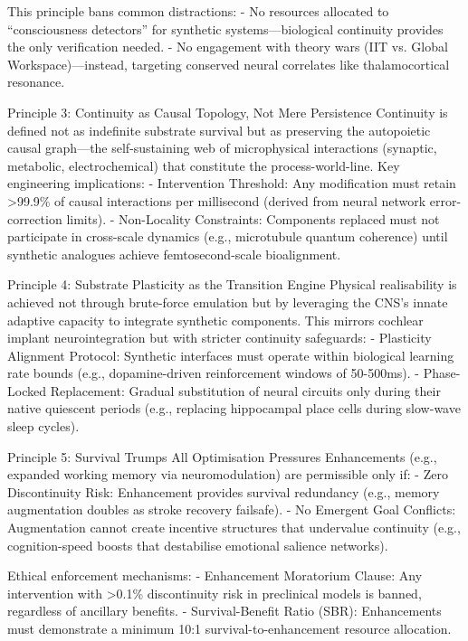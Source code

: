 \documentclass[10pt]{article}
\begin{document}
\begin{sloppypar}
  This principle bans common distractions:
  - No resources allocated to “consciousness detectors” for synthetic systems—biological continuity provides the only verification needed.
  - No engagement with theory wars (IIT vs. Global Workspace)—instead, targeting conserved neural correlates like thalamocortical resonance.

  Principle 3: Continuity as Causal Topology, Not Mere Persistence
  Continuity is defined not as indefinite substrate survival but as preserving the autopoietic causal graph—the self-sustaining web of microphysical interactions (synaptic, metabolic, electrochemical) that constitute the process-world-line. Key engineering implications:
  - Intervention Threshold: Any modification must retain >99.9\% of causal interactions per millisecond (derived from neural network error-correction limits).
  - Non-Locality Constraints: Components replaced must not participate in cross-scale dynamics (e.g., microtubule quantum coherence) until synthetic analogues achieve femtosecond-scale bioalignment.

  Principle 4: Substrate Plasticity as the Transition Engine
  Physical realisability is achieved not through brute-force emulation but by leveraging the CNS’s innate adaptive capacity to integrate synthetic components. This mirrors cochlear implant neurointegration but with stricter continuity safeguards:
  - Plasticity Alignment Protocol: Synthetic interfaces must operate within biological learning rate bounds (e.g., dopamine-driven reinforcement windows of 50-500ms).
  - Phase-Locked Replacement: Gradual substitution of neural circuits only during their native quiescent periods (e.g., replacing hippocampal place cells during slow-wave sleep cycles).

  Principle 5: Survival Trumps All Optimisation Pressures
  Enhancements (e.g., expanded working memory via neuromodulation) are permissible only if:
  - Zero Discontinuity Risk: Enhancement provides survival redundancy (e.g., memory augmentation doubles as stroke recovery failsafe).
  - No Emergent Goal Conflicts: Augmentation cannot create incentive structures that undervalue continuity (e.g., cognition-speed boosts that destabilise emotional salience networks).

  Ethical enforcement mechanisms:
  - Enhancement Moratorium Clause: Any intervention with >0.1\% discontinuity risk in preclinical models is banned, regardless of ancillary benefits.
  - Survival-Benefit Ratio (SBR): Enhancements must demonstrate a minimum 10:1 survival-to-enhancement resource allocation.


\end{sloppypar}
\end{document}

